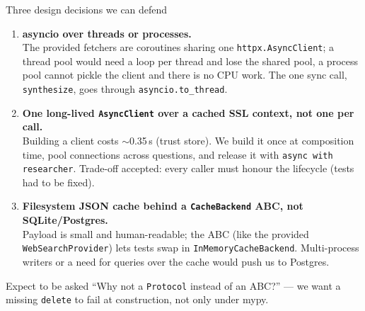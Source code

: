 \documentclass[aspectratio=169,11pt]{beamer}
\begin{document}
\begin{frame}{Three design decisions we can defend}
  \begin{enumerate}\setlength\itemsep{0.6em}
    \item \textbf{asyncio over threads or processes.}\\
      The provided fetchers are coroutines sharing one \texttt{httpx.AsyncClient}; a thread pool would need a loop per thread and lose the shared pool, a process pool cannot pickle the client and there is no CPU work. The one sync call, \texttt{synthesize}, goes through \texttt{asyncio.to\_thread}.
    \item \textbf{One long-lived \texttt{AsyncClient} over a cached SSL context, not one per call.}\\
      Building a client costs $\sim$0.35\,s (trust store). We build it once at composition time, pool connections across questions, and release it with \texttt{async with researcher}. Trade-off accepted: every caller must honour the lifecycle (tests had to be fixed).
    \item \textbf{Filesystem JSON cache behind a \texttt{CacheBackend} ABC, not SQLite/Postgres.}\\
      Payload is small and human-readable; the ABC (like the provided \texttt{WebSearchProvider}) lets tests swap in \texttt{InMemoryCacheBackend}. Multi-process writers or a need for queries over the cache would push us to Postgres.
  \end{enumerate}

  \vspace{0.4em}
  \begin{block}{Expect to be asked}
    ``Why not a \texttt{Protocol} instead of an ABC?'' --- we want a missing \texttt{delete} to fail at construction, not only under mypy.
  \end{block}
\end{frame}
\end{document}

